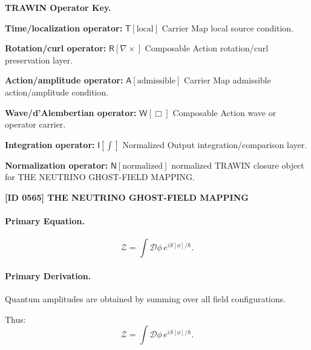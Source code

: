\par\vspace{0.45\baselineskip}
\noindent\begin{minipage}[t]{\linewidth}
\begingroup
\small
\raggedright
\textbf{TRAWIN Operator Key.}\par
\noindent\textbf{Time/localization operator:} $\mathsf{T}\!\left[\mathrm{local}\right]$ Carrier Map local source condition.\par
\noindent\textbf{Rotation/curl operator:} $\mathsf{R}\!\left[\nabla\times\right]$ Composable Action rotation/curl preservation layer.\par
\noindent\textbf{Action/amplitude operator:} $\mathsf{A}\!\left[\mathrm{admissible}\right]$ Carrier Map admissible action/amplitude condition.\par
\noindent\textbf{Wave/d'Alembertian operator:} $\mathsf{W}\!\left[\Box\right]$ Composable Action wave or operator carrier.\par
\noindent\textbf{Integration operator:} $\mathsf{I}\!\left[\int\right]$ Normalized Output integration/comparison layer.\par
\noindent\textbf{Normalization operator:} $\mathsf{N}\!\left[\mathrm{normalized}\right]$ normalized TRAWIN closure object for THE NEUTRINO GHOST-FIELD MAPPING.\par
\endgroup
\end{minipage}

\clearpage
\noindent\textbf{[ID 0565] THE NEUTRINO GHOST-FIELD MAPPING}\par
\vspace{0.35em}
\paragraph{Primary Equation.}
\begin{equation}
\mathcal{Z}
=
\int \mathcal{D}\phi \, e^{iS[\phi]/\hbar}.
\end{equation}

\paragraph{Primary Derivation.}
Quantum amplitudes are obtained by summing over all field configurations.

Thus:
\begin{equation}
\boxed{
\mathcal{Z}
=
\int \mathcal{D}\phi \, e^{iS[\phi]/\hbar}.
}
\end{equation}

